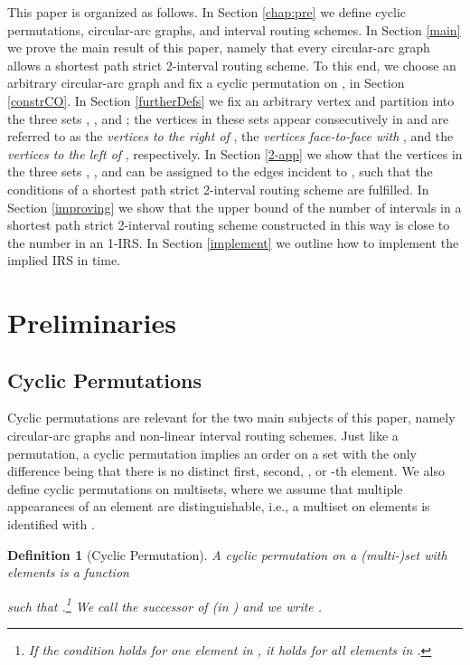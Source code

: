 \documentclass[10pt]{article}
\newtheorem{definition}[theorem]{Definition}
\begin{document}
This paper is organized as follows.
In Section \ref{chap:pre} we define cyclic permutations, circular-arc graphs, 
and  interval routing schemes.  
In Section \ref{main} we prove 
the main result of this paper, namely that every circular-arc graph allows a shortest path 
strict 2-interval routing scheme. 
To this end, we choose an arbitrary circular-arc graph  and 
fix a cyclic permutation   on , in Section \ref{constrCO}. 
In Section \ref{furtherDefs} we fix an arbitrary vertex  and partition  into the three sets , , and ; the vertices in these sets appear consecutively in  and are referred to as  the \emph{vertices to the right of }, the \emph{vertices face-to-face with }, and the \emph{vertices to the left of }, respectively.
In Section \ref{2-app} we show that the vertices in the 
three sets  , , and  can be assigned to the edges incident to , such that 
the conditions of a shortest path 
strict 2-interval routing scheme are fulfilled. 
In Section \ref{improving} we show that the upper bound of the number of intervals in a shortest path strict 2-interval routing scheme constructed in this way
is close to the number in an 1-IRS.
In Section \ref{implement} we outline  how to 
implement the implied IRS in  time.






\section{Preliminaries\label{chap:pre}}




\subsection{Cyclic Permutations}\label{cyclicOrders}



Cyclic permutations are relevant for the two main subjects of this paper, 
namely circular-arc graphs and non-linear interval routing schemes. 
Just like a permutation, a cyclic permutation implies an order on a set 
with the only difference being that there is no distinct first, second, ,
or -th element. We also define cyclic permutations on multisets, where
we assume that multiple appearances of an element are
distinguishable, i.e., 
a multiset  on  elements is identified with 
.







\begin{definition}[Cyclic Permutation]
A \emph{cyclic permutation} on a (multi-)set  with  elements is a function

such that  
.\footnote{If 
the condition holds for one element in , it holds for all elements in .}
We call  the \emph{successor of  (in )} and we write
.
\end{definition}
\end{document}
